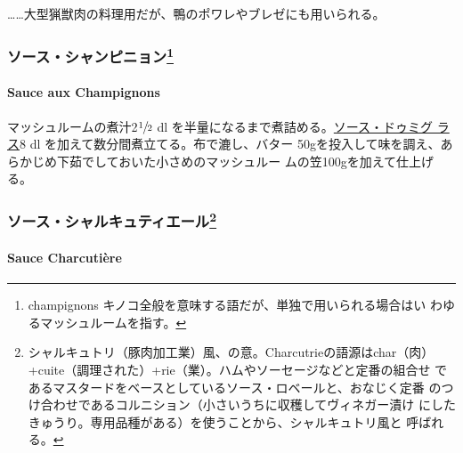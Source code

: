 \documentclass[twoside,12Q,b5j]{escoffierltjsbook}
\renewcommand{\ldots}{…}
\newenvironment{recette}{\begin{small}\begin{spacing}{1}\begin{multicols}{2}}{\end{multicols}\end{spacing}\end{small}}
\begin{document}
\begin{recette}
\ldots{}\ldots{}大型猟獣肉の料理用だが、鴨のポワレやブレゼにも用いられる。

\vspace*{1.7\zw}

\subsubsection[ソース・シャンピニョン]{\texorpdfstring{ソース・シャンピニョン\footnote{champignons
  キノコ全般を意味する語だが、単独で用いられる場合はい
  わゆるマッシュルームを指す。}}{ソース・シャンピニョン}}\label{ux30bdux30fcux30b9ux30b7ux30e3ux30f3ux30d4ux30cbux30e7ux30f37}

\paragraph{Sauce aux Champignons}\label{sauce-aux-champignons}


マッシュルームの煮汁2\(\sfrac{1}{2}\) dl
を半量になるまで煮詰める。\protect\hyperlink{sauce-demi-glace}{ソース・ドゥミグ
ラス}8 dl を加えて数分間煮立てる。布で漉し、バター
50gを投入して味を調え、あらかじめ下茹でしておいた小さめのマッシュルー
ムの笠100gを加えて仕上げる。

\vspace*{1.7\zw}

\subsubsection[ソース・シャルキュティエール]{\texorpdfstring{ソース・シャルキュティエール\footnote{シャルキュトリ（豚肉加工業）風、の意。Charcutrieの語源はchar（肉）
  +cuite（調理された）+rie（業）。ハムやソーセージなどと定番の組合せ
  であるマスタードをベースとしているソース・ロベールと、おなじく定番
  のつけ合わせであるコルニション（小さいうちに収穫してヴィネガー漬け
  にしたきゅうり。専用品種がある）を使うことから、シャルキュトリ風と
  呼ばれる。}}{ソース・シャルキュティエール}}\label{ux30bdux30fcux30b9ux30b7ux30e3ux30ebux30adux30e5ux30c6ux30a3ux30a8ux30fcux30eb8}

\paragraph{Sauce Charcutière}\label{sauce-charcutiere}


\end{recette}
\end{document}
